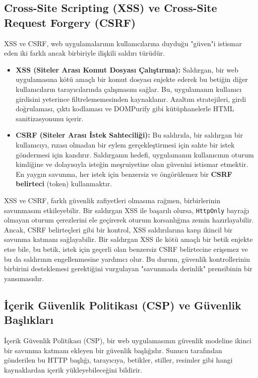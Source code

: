 \subsection{Cross-Site Scripting (XSS) ve Cross-Site Request Forgery (CSRF)}

XSS ve CSRF, web uygulamalarının kullanıcılarına duyduğu "güven"i istismar eden iki farklı ancak birbiriyle ilişkili saldırı türüdür.

\begin{itemize}
\item \textbf{XSS (Siteler Arası Komut Dosyası Çalıştırma):} Saldırgan, bir web uygulamasına kötü amaçlı bir komut dosyası enjekte ederek bu betiğin diğer kullanıcıların tarayıcılarında çalışmasını sağlar. Bu, uygulamanın kullanıcı girdisini yeterince filtrelememesinden kaynaklanır. Azaltım stratejileri, girdi doğrulaması, çıktı kodlaması ve DOMPurify gibi kütüphanelerle HTML sanitizasyonunu içerir.
\item \textbf{CSRF (Siteler Arası İstek Sahteciliği):} Bu saldırıda, bir saldırgan bir kullanıcıyı, rızası olmadan bir eylem gerçekleştirmesi için sahte bir istek göndermesi için kandırır. Saldırganın hedefi, uygulamanın kullanıcının oturum kimliğine ve dolayısıyla isteğin meşruiyetine olan güvenini istismar etmektir. En yaygın savunma, her istek için benzersiz ve öngörülemez bir \textbf{CSRF belirteci} (token) kullanmaktır.
\end{itemize}

XSS ve CSRF, farklı güvenlik zafiyetleri olmasına rağmen, birbirlerinin savunmasını etkileyebilir. Bir saldırgan XSS ile başarılı olursa, \texttt{HttpOnly} bayrağı olmayan oturum çerezlerini ele geçirerek oturum korsanlığına zemin hazırlayabilir. Ancak, CSRF belirteçleri gibi bir kontrol, XSS saldırılarına karşı ikincil bir savunma katmanı sağlayabilir. Bir saldırgan XSS ile kötü amaçlı bir betik enjekte etse bile, bu betik, istek için geçerli olan benzersiz CSRF belirtecine erişemez ve bu da saldırının engellenmesine yardımcı olur. Bu durum, güvenlik kontrollerinin birbirini desteklemesi gerektiğini vurgulayan "savunmada derinlik" prensibinin bir yansımasıdır.

\subsection{İçerik Güvenlik Politikası (CSP) ve Güvenlik Başlıkları}

İçerik Güvenlik Politikası (CSP), bir web uygulamasının güvenlik modeline ikinci bir savunma katmanı ekleyen bir güvenlik başlığıdır. Sunucu tarafından gönderilen bu HTTP başlığı, tarayıcıya, betikler, stiller, resimler gibi hangi kaynaklardan içerik yükleyebileceğini bildirir.

